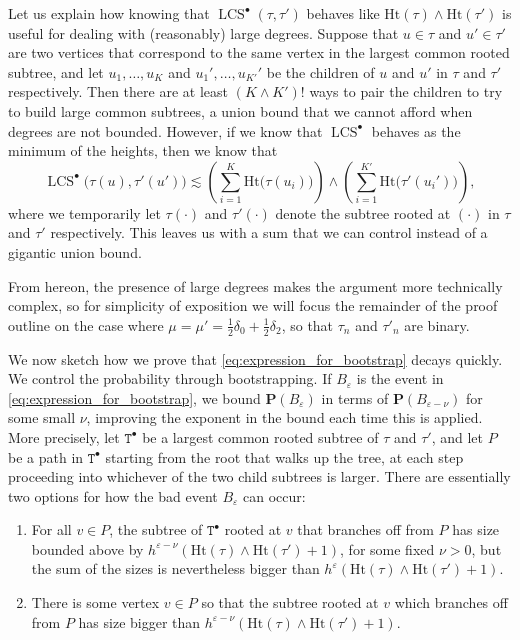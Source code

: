 \documentclass[11pt,reqno]{amsart}
\newcommand{\1}{\mathbf{1}}
\newcommand{\0}{\mathbf{0}}
\newcommand{\ttT}{\mathtt{T}}
\newcommand{\prob}{\mathbf{P}}
\newcommand{\Ht}{\mathrm{Ht}}
\newcommand{\LCS}{\operatorname{LCS}}
\newcommand{\eps}{\varepsilon}
\begin{document}
Let us explain how knowing that $\LCS^\bullet(\tau,\tau')$ behaves like $\Ht(\tau) \wedge \Ht(\tau')$ is useful for dealing with (reasonably) large degrees. Suppose that $u \in \tau$ and $u' \in \tau'$ are two vertices that correspond to the same vertex in the largest common rooted subtree, and let $u_1,\ldots,u_K$ and $u_1',\ldots,u_{K'}'$ be the children of $u$ and $u'$ in $\tau$ and $\tau'$ respectively. Then there are at least $(K \wedge K')!$ ways to pair the children to try to build large common subtrees, a union bound that we cannot afford when degrees are not bounded. However, if we know that $\LCS^\bullet$ behaves as the minimum of the heights, then we know that 
$$
\LCS^\bullet\big(\tau(u),\tau'(u')\big) \lesssim \left(\sum_{i=1}^{K} \Ht\big(\tau(u_i)\big)\right) \wedge \left(\sum_{i=1}^{K'} \Ht\big(\tau'(u_i')\big)\right),
$$
where we temporarily let $\tau(\cdot)$ and $\tau'(\cdot)$ denote the subtree rooted at $(\cdot)$ in $\tau$ and $\tau'$ respectively. This leaves us with a sum that we can control instead of a gigantic union bound. 
\smallskip

From hereon, the presence of large degrees makes the argument more technically complex, so for simplicity of exposition we will focus the remainder of the proof outline on the case where $\mu=\mu'=\tfrac{1}{2}\delta_0+\tfrac{1}{2} \delta_2$, so that $\tau_n$ and $\tau'_n$ are binary.
\smallskip

We now sketch how we prove that \eqref{eq:expression_for_bootstrap} decays quickly. 
We control the probability through bootstrapping. 
If $B_\eps$ is the event in \eqref{eq:expression_for_bootstrap}, we bound $\prob(B_\eps)$ in terms of $\prob(B_{\eps-\nu})$ for some small $\nu$, improving the exponent in the bound each time this is applied. 
More precisely, let $\ttT^\bullet$ be a largest common rooted subtree of $\tau$ and $\tau'$, and let $P$ be a path in $\ttT^\bullet$ starting from the root that walks up the tree, at each step proceeding into whichever of the two child subtrees is larger.
There are essentially two options for how the bad event $B_\eps$ can occur:
\begin{enumerate}
    \setlength{\itemsep}{0.01em}
    \item[(i)] For all $v \in P$, the subtree of $\ttT^\bullet$ rooted at $v$ that branches off from $P$ has size bounded above by $h^{\varepsilon-\nu}(\Ht(\tau) \wedge \Ht(\tau')+1)$, for some fixed $\nu>0$, but the sum of the sizes is nevertheless bigger than $h^\varepsilon (\Ht(\tau) \wedge \Ht(\tau')+1)$.
    \item[(ii)] There is some vertex $v\in P$ so that the subtree rooted at $v$ which branches off from $P$ has size bigger than $h^{\varepsilon-\nu}(\Ht(\tau) \wedge \Ht(\tau')+1)$.
\end{enumerate}
\end{document}
